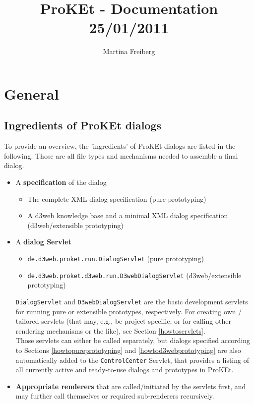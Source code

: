 \documentclass[a4paper,10pt]{scrreprt}
\title{ProKEt - Documentation\\
	\Large{25/01/2011}
	}
\author{Martina Freiberg}
\begin{document}
\maketitle
\tableofcontents

\chapter{General}

\section{Ingredients of ProKEt dialogs}
To provide an overview, the 'ingredients' of ProKEt dialogs are listed in the following. 
Those are all file types and mechanisms needed to assemble a final dialog.
\begin{itemize}
	\item A \textbf{specification} of the dialog
	\begin{itemize}
		\item The complete XML dialog specification (pure prototyping)
		\item A d3web knowledge base and a minimal XML dialog specification (d3web/extensible prototyping)
	\end{itemize}
	\item A \textbf{dialog Servlet}
	\begin{itemize}
		\item \texttt{de.d3web.proket.run.DialogServlet} (pure prototyping)
		\item \texttt{de.d3web.proket.d3web.run.D3webDialogServlet} (d3web/extensible prototyping)
	\end{itemize}
	\texttt{DialogServlet} and \texttt{D3webDialogServlet} are the basic development servlets for running pure or extensible prototypes, respectively.
	For creating own / tailored servlets (that may, e.g., be project-specific, or for calling other rendering mechanisms or the like), see Section \ref{howtoservlets}.\\
	Those servlets can either be called separately, but dialogs specified according to Sections \ref{howtopureprototyping} and \ref{howtod3webprototyping} are also automatically added to the \texttt{ControlCenter} Servlet, that provides a listing of all currently active and ready-to-use dialogs and prototypes in ProKEt.
	\item \textbf{Appropriate renderers} that are called/initiated by the servlets first, and may further call themselves or required sub-renderers recursively.\\

\end{itemize}
\end{document}
